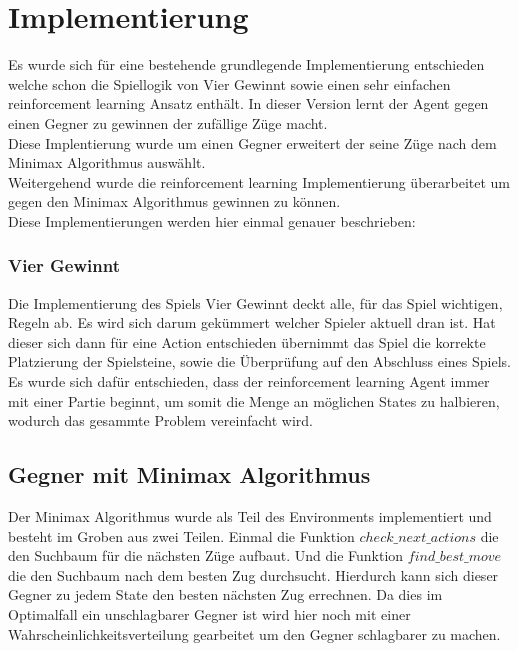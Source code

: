 \chapter{Implementierung}%

\label{cha:Implementierung}
Es wurde sich für eine bestehende grundlegende Implementierung entschieden welche schon die Spiellogik von Vier Gewinnt sowie einen sehr einfachen reinforcement learning Ansatz enthält. In dieser Version lernt der Agent gegen einen Gegner zu gewinnen der zufällige Züge macht.\cite{connectfork}\\
Diese Implentierung wurde um einen Gegner erweitert der seine Züge nach dem Minimax Algorithmus auswählt.\\
Weitergehend wurde die reinforcement learning Implementierung überarbeitet um gegen den Minimax Algorithmus gewinnen zu können.\\
Diese Implementierungen werden hier einmal genauer beschrieben:\\

\subsection{Vier Gewinnt}
Die Implementierung des Spiels Vier Gewinnt deckt alle, für das Spiel wichtigen, Regeln ab. Es wird sich darum gekümmert welcher Spieler aktuell dran ist. Hat dieser sich dann für eine Action entschieden übernimmt das Spiel die korrekte Platzierung der Spielsteine, sowie die Überprüfung auf den Abschluss eines Spiels.\\ 
Es wurde sich dafür entschieden, dass der reinforcement learning Agent immer mit einer Partie beginnt, um somit die Menge an möglichen States zu halbieren, wodurch das gesammte Problem vereinfacht wird.

\section{Gegner mit Minimax Algorithmus}
Der Minimax Algorithmus wurde als Teil des Environments implementiert und besteht im Groben aus zwei Teilen. Einmal die Funktion $check\_next\_actions$ die den Suchbaum für die nächsten Züge aufbaut. Und die Funktion $find\_best\_move$ die den Suchbaum nach dem besten Zug durchsucht. Hierdurch kann sich dieser Gegner zu jedem State den besten nächsten Zug errechnen. Da dies im Optimalfall ein unschlagbarer Gegner ist wird hier noch mit einer Wahrscheinlichkeitsverteilung gearbeitet um den Gegner schlagbarer zu machen.

